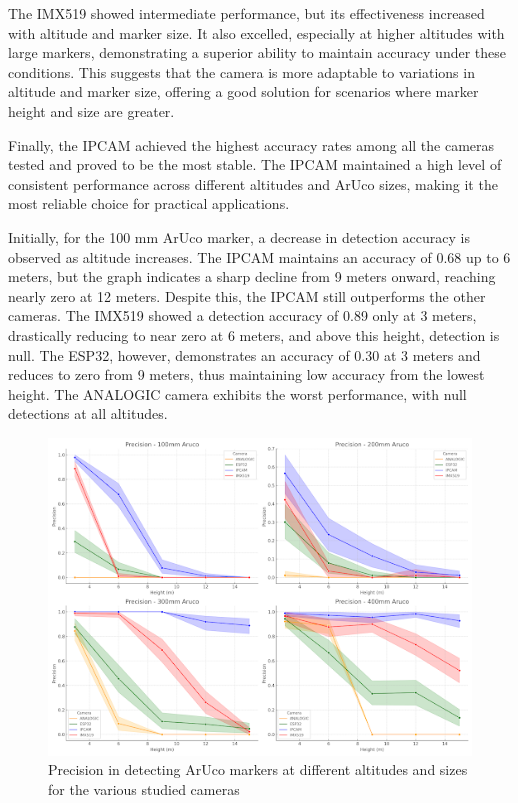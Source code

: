 \documentclass[letterpaper]{article}
\begin{document}
The IMX519 showed intermediate performance, but its effectiveness increased with altitude and marker size. It also excelled, especially at higher altitudes with large markers, demonstrating a superior ability to maintain accuracy under these conditions. This suggests that the camera is more adaptable to variations in altitude and marker size, offering a good solution for scenarios where marker height and size are greater.

Finally, the IPCAM achieved the highest accuracy rates among all the cameras tested and proved to be the most stable. The IPCAM maintained a high level of consistent performance across different altitudes and ArUco sizes, making it the most reliable choice for practical applications.

Initially, for the 100 mm ArUco marker, a decrease in detection accuracy is observed as altitude increases. The IPCAM maintains an accuracy of 0.68 up to 6 meters, but the graph indicates a sharp decline from 9 meters onward, reaching nearly zero at 12 meters. Despite this, the IPCAM still outperforms the other cameras. The IMX519 showed a detection accuracy of 0.89 only at 3 meters, drastically reducing to near zero at 6 meters, and above this height, detection is null. The ESP32, however, demonstrates an accuracy of 0.30 at 3 meters and reduces to zero from 9 meters, thus maintaining low accuracy from the lowest height. The ANALOGIC camera exhibits the worst performance, with null detections at all altitudes.

\begin{figure}[H]
\centering
\includegraphics[width=1\columnwidth]{images/accuracy_detecting_aruco.png}
\caption{Precision in detecting ArUco markers at different altitudes and sizes for the various studied cameras}
\label{figure:accuracy_detecting_aruco}
\end{figure}
\end{document}
